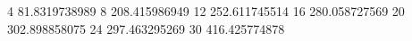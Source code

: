 4 81.8319738989
8 208.415986949
12 252.611745514
16 280.058727569
20 302.898858075
24 297.463295269
30 416.425774878
